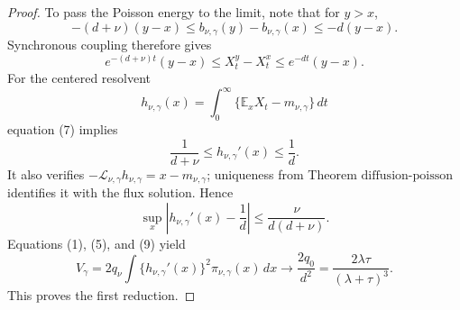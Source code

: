 \documentclass{article}
\begin{document}
\begin{proof}
To pass the Poisson energy to the limit, note that for \(y>x\),
\[
 -(d+\nu)(y-x)
 \leq b_{\nu,\gamma}(y)-b_{\nu,\gamma}(x)
 \leq-d(y-x).                                                  \tag{6}
\]
Synchronous coupling therefore gives
\[
 e^{-(d+\nu)t}(y-x)
 \leq X_t^y-X_t^x\leq e^{-dt}(y-x).                            \tag{7}
\]
For the centered resolvent
\[
 h_{\nu,\gamma}(x)=
 \int_0^\infty\{\mathbb E_xX_t-m_{\nu,\gamma}\}\,dt
\]
equation (7) implies
\[
 \frac1{d+\nu}\leq h_{\nu,\gamma}'(x)\leq\frac1d.           \tag{8}
\]
It also verifies \(-\mathcal L_{\nu,\gamma}h_{\nu,\gamma}=x-m_{\nu,\gamma}\); uniqueness from Theorem \(\mathrm{diffusion\mbox{-}poisson}\) identifies it with the flux solution.  Hence
\[
 \sup_x\left|h_{\nu,\gamma}'(x)-\frac1d\right|
 \leq\frac\nu{d(d+\nu)}.                                    \tag{9}
\]
Equations (1), (5), and (9) yield
\[
 V_\gamma
 =2q_\nu\int\{h_{\nu,\gamma}'(x)\}^2\pi_{\nu,\gamma}(x)\,dx
 \longrightarrow\frac{2q_0}{d^2}
 =\frac{2\lambda\tau}{(\lambda+\tau)^3}.                    \tag{10}
\]
This proves the first reduction.


\end{proof}
\end{document}
